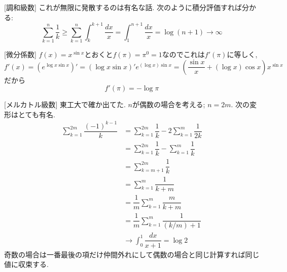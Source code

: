 
 [調和級数] これが無限に発散するのは有名な話. 次のように積分評価すれば分かる:
\[
\sum_{k=1}^{n} \dfrac{1}{k} \geq \sum_{k=1}^{n} \int_{k}^{k+1} \dfrac{dx}{x} = \int_{1}^{n+1} \dfrac{dx}{x} = \log{(n+1)} \to \infty
\] 


 [微分係数] $f(x) = x^{\sin{x}}$とおくと$f(\pi) = \pi^{0} = 1$なのでこれは$f'(\pi)$に等しく, $f'(x) = (e^{\log{x} \sin{x}})' = (\log{x}\sin{x})' e^{(\log{x})\sin{x}} = (\dfrac{\sin{x}}{x} + (\log{x})\cos{x})x^{\sin{x}}$だから
\[f'(\pi) = -\log{\pi} \] 

 [メルカトル級数] 東工大で確か出てた. $n$が偶数の場合を考える; $n=2m$. 次の変形はとても有名. 
\begin{align*}
\sum_{k=1}^{2m} \dfrac{(-1)^{k-1}}{k} &= \sum_{k=1}^{2m} \dfrac{1}{k} - 2\sum_{k=1}^{m} \dfrac{1}{2k} \\
&= \sum_{k=1}^{2m}\dfrac{1}{k} - \sum_{k=1}^{m} \dfrac{1}{k} \\
&= \sum_{k=m+1}^{2m} \dfrac{1}{k} \\
&= \sum_{k=1}^{m} \dfrac{1}{k+m} \\
&= \dfrac{1}{m} \sum_{k=1}^{m} \dfrac{m}{k+m} \\
&= \dfrac{1}{m} \sum_{k=1}^{m} \dfrac{1}{(k/m) + 1}\\
&\to \int_{0}^{1} \dfrac{dx}{x+1} = \log{2}
\end{align*}
奇数の場合は一番最後の項だけ仲間外れにして偶数の場合と同じ計算すれば同じ値に収束する. 



